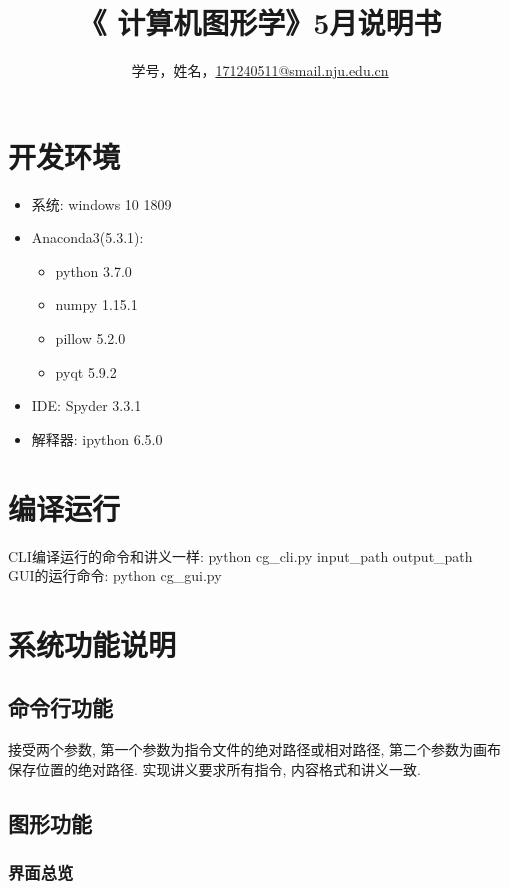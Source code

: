 \documentclass[a4paper,UTF8]{article}
\theoremstyle{definition}
\begin{document}
\title{\textbf{《 计算机图形学》5月说明书}}
\author{学号，姓名，\href{mailto:xxx@xxx.com}{171240511@smail.nju.edu.cn}}
\maketitle

\section{开发环境}
\begin{itemize}
\item 系统: windows 10 1809
\item Anaconda3(5.3.1): 
	\begin{itemize}
		\item python 3.7.0
		\item numpy 1.15.1
		\item pillow 5.2.0
		\item pyqt 5.9.2
	\end{itemize}
\item IDE: Spyder 3.3.1
\item 解释器: ipython 6.5.0
\end{itemize}
\section{编译运行}
CLI编译运行的命令和讲义一样: python cg\_cli.py input\_path output\_path\\
\indent GUI的运行命令: python cg\_gui.py
\section{系统功能说明}
\subsection{命令行功能}
接受两个参数, 第一个参数为指令文件的绝对路径或相对路径, 第二个参数为画布保存位置的绝对路径.
实现讲义要求所有指令, 内容格式和讲义一致.
\subsection{图形功能}
\subsubsection{界面总览}
\end{document}
